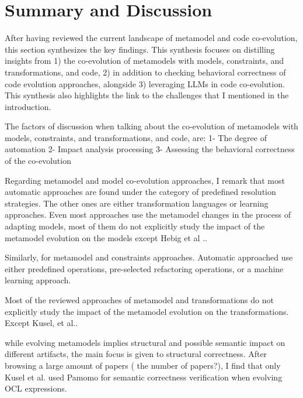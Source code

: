  \section{Summary and Discussion}
  After having reviewed the current landscape of metamodel and code co-evolution, this section synthesizes the key findings. This synthesis focuses on distilling insights from 1) the co-evolution of metamodels with models, constraints, and transformations, and code, 2) in addition to checking behavioral correctness of code evolution approaches, alongside 3) leveraging LLMs in code co-evolution. This synthesis also highlights the link to the challenges that I mentioned in the introduction.
  
  The factors of discussion when talking about the co-evolution of metamodels with models, constraints, and transformations, and code, are: 
  1- The degree of automation
  2- Impact analysis processing
  3- Assessing the behavioral correctness of the co-evolution
  
  Regarding metamodel and model co-evolution approaches, I remark that most automatic approaches are found under the category of predefined resolution strategies. The other ones are either transformation languages or learning approaches. Even most approaches use the metamodel changes in the process of adapting models, most of them do not explicitly study the impact of the metamodel evolution on the models except Hebig et al .\cite{hebig2016approaches}.
  
  Similarly, for metamodel and constraints approaches.
  Automatic approached use either predefined operations, pre-selected refactoring operations, or a machine learning approach.
  
 
  Most of the reviewed approaches of metamodel and transformations  do not explicitly study the impact of the metamodel evolution on the transformations. Except Kusel, et al.\cite{kusel2015consistent}.
  
  
  
  while evolving metamodels implies structural and possible semantic impact on different artifacts, the main focus is given to structural correctness. After browsing a large amount of papers ( the number of papers?), I find that only Kusel et al. \cite{kusel2015systematic} used Pamomo\cite{10.1007/s10515-012-0102-y} for semantic correctness verification when evolving OCL expressions.
  
